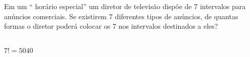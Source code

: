 \begin{ex}
 	 Em um “ horário especial” um diretor de televisão dispõe de 7 intervalos para anúncios comerciais. Se existirem 7 diferentes tipos de anúncios, de quantas formas o diretor poderá colocar os 7 nos intervalos destinados a eles?
 	   \begin{sol}
 	     \phantom{A} \\
 	     $7!=5040$
 	   \end{sol}
\end{ex}